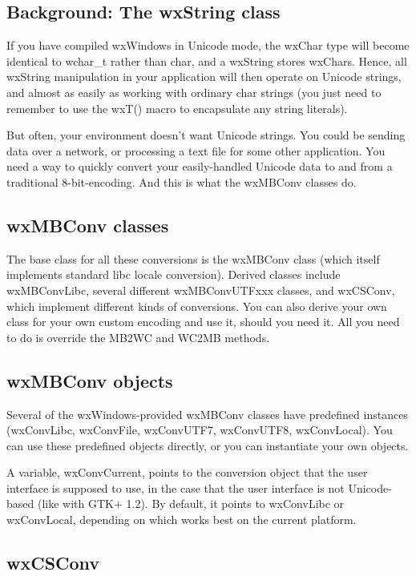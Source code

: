 \subsection{Background: The wxString class}

If you have compiled wxWindows in Unicode mode, the wxChar type will become
identical to wchar\_t rather than char, and a wxString stores wxChars. Hence,
all wxString manipulation in your application will then operate on Unicode
strings, and almost as easily as working with ordinary char strings (you
just need to remember to use the wxT() macro to encapsulate any string
literals).

But often, your environment doesn't want Unicode strings. You could be sending
data over a network, or processing a text file for some other application. You
need a way to quickly convert your easily-handled Unicode data to and from a
traditional 8-bit-encoding. And this is what the wxMBConv classes do.

\subsection{wxMBConv classes}

The base class for all these conversions is the wxMBConv class (which itself
implements standard libc locale conversion). Derived classes include
wxMBConvLibc, several different wxMBConvUTFxxx classes, and wxCSConv, which
implement different kinds of conversions. You can also derive your own class
for your own custom encoding and use it, should you need it. All you need to do
is override the MB2WC and WC2MB methods.

\subsection{wxMBConv objects}

Several of the wxWindows-provided wxMBConv classes have predefined instances
(wxConvLibc, wxConvFile, wxConvUTF7, wxConvUTF8, wxConvLocal). You can use
these predefined objects directly, or you can instantiate your own objects.

A variable, wxConvCurrent, points to the conversion object that the user
interface is supposed to use, in the case that the user interface is not
Unicode-based (like with GTK+ 1.2). By default, it points to wxConvLibc or
wxConvLocal, depending on which works best on the current platform.

\subsection{wxCSConv}

